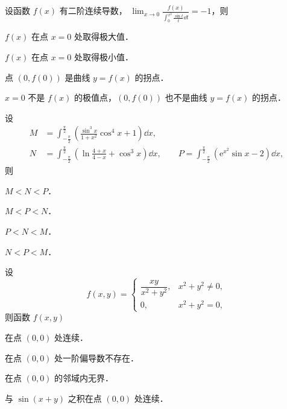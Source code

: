 
\begin{question}[index=1]
设函数 $f(x)$ 有二阶连续导数，
$\displaystyle \lim_{x\to 0}\frac{f(x)}{\displaystyle\int_0^{x^2}\frac{\sin t}{t}\dd t}=-1$，则
\begin{choices}[columns=1]
\item $f(x)$ 在点 $x=0$ 处取得极大值．
\item $f(x)$ 在点 $x=0$ 处取得极小值．
\item 点 $(0,f(0))$ 是曲线 $y=f(x)$ 的拐点．
\item $x=0$ 不是 $f(x)$ 的极值点，$(0,f(0))$ 也不是曲线 $y=f(x)$ 的拐点．
\end{choices}
\end{question}
\QuestionBreak

\begin{question}[index=2]
设
\[
\begin{aligned}
M&=\int_{-\frac{\pi}{2}}^{\frac{\pi}{2}}\left(\frac{\sin^3 x}{1+x^2}\cos^4 x+1\right)\dd x,\\
N&=\int_{-\frac{\pi}{2}}^{\frac{\pi}{2}}\left(\ln\frac{4+x}{4-x}+\cos^3 x\right)\dd x,\qquad
P=\int_{-\frac{\pi}{2}}^{\frac{\pi}{2}}(\mathrm e^{x^2}\sin x-2)\dd x,
\end{aligned}
\]
则
\begin{choices}[columns=2]
\item $M<N<P$．
\item $M<P<N$．
\item $P<N<M$．
\item $N<P<M$．
\end{choices}
\end{question}
\QuestionBreak

\begin{question}[index=3]
设
\[
f(x,y)=\begin{cases}
\dfrac{xy}{x^2+y^2}, & x^2+y^2\ne0,\\[3pt]
0, & x^2+y^2=0,
\end{cases}
\]
则函数 $f(x,y)$
\begin{choices}[columns=2]
\item 在点 $(0,0)$ 处连续．
\item 在点 $(0,0)$ 处一阶偏导数不存在．
\item 在点 $(0,0)$ 的邻域内无界．
\item 与 $\sin(x+y)$ 之积在点 $(0,0)$ 处连续．
\end{choices}
\end{question}
\QuestionBreak

